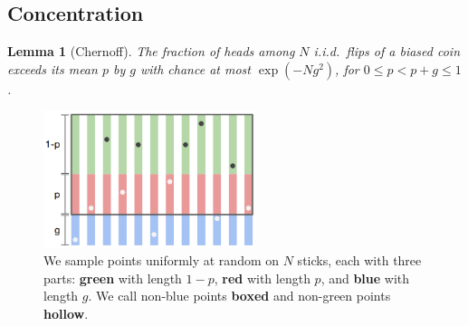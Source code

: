 \documentclass[twocolumn, 11pt]{article}
\newtheorem*{lem}{Lemma}
\theoremstyle{definition}
\newcommand{\msec}[1]{\subsection*{\color{mblu}\textsf{#1}}}
\begin{document}
    \msec{Concentration}

        \begin{lem}[Chernoff]
            The fraction of heads among $N$ i.i.d.\ flips of a biased coin
            exceeds its mean $p$ by $g$ with chance at most 
            $\exp(-Ng^2)$, for $0 \leq p < p+g \leq 1$.
        \end{lem}
        \vspace{-0.5cm}
        \begin{figure}[H]
            \centering
            \includegraphics[height=4cm, clip]{chernoff}
            \caption{{
                We sample points uniformly at random on $N$
                sticks, each with three parts: \textbf{green}
                with length $1-p$, \textbf{red} with length $p$, and
                \textbf{blue} with length $g$.  We call non-blue points
                \textbf{boxed} and non-green points \textbf{hollow}.
            }}
            \label{fig:chernoff}
        \end{figure}
        \vspace{-0.5cm}
\end{document}
